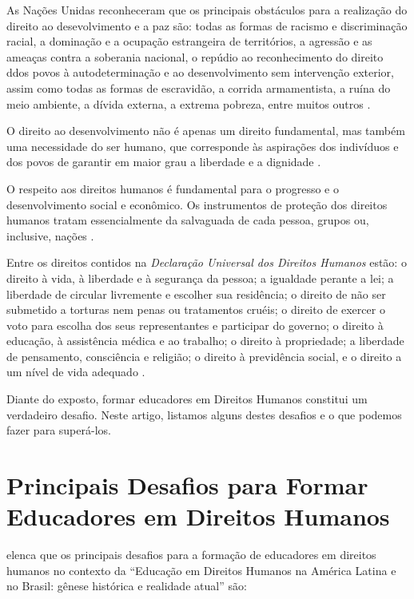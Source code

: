 \documentclass[
	article,			%
	11pt,				%
	oneside,			%
	a4paper,			%
	english,			%
	brazil,				%
	sumario=tradicional
]{abntex2}
\begin{document}
As Nações Unidas reconheceram que os principais obstáculos para a realização do
direito ao desevolvimento e a paz são: todas as formas de racismo e
discriminação racial, a dominação e a ocupação estrangeira de territórios, a
agressão e as ameaças contra a soberania nacional, o repúdio ao reconhecimento
do direito ddos povos à autodeterminação e ao desenvolvimento sem intervenção
exterior, assim como todas as formas de escravidão, a corrida armamentista,
a ruína do meio ambiente, a dívida externa, a extrema pobreza, entre muitos
outros \cite{RAYO2004}.

\noindent
O direito ao desenvolvimento não é apenas um direito fundamental, mas também uma
necessidade do ser humano, que corresponde às aspirações dos indivíduos e dos
povos de garantir em maior grau a liberdade e a dignidade
\cite{RAYO2004}.

\noindent
O respeito aos direitos humanos é fundamental para o progresso e o
desenvolvimento social e econômico. Os instrumentos de proteção dos direitos
humanos tratam essencialmente da salvaguada de cada pessoa, grupos ou,
inclusive, nações \cite{RAYO2004}.

\noindent
Entre os direitos contidos na \textit{Declaração Universal dos Direitos Humanos}
estão: o direito à vida, à liberdade e à segurança da pessoa; a igualdade
perante a lei; a liberdade de circular livremente e escolher sua residência; o
direito de não ser submetido a torturas nem penas ou tratamentos cruéis; o
direito de exercer o voto para escolha dos seus representantes e participar do
governo; o direito à educação, à assistência médica e ao trabalho; o direito à
propriedade; a liberdade de pensamento, consciência e religião; o direito à
previdência social, e o direito a um nível de vida adequado
\cite{ONU1948}.

\noindent
Diante do exposto, formar educadores em Direitos Humanos constitui um verdadeiro
desafio. Neste artigo, listamos alguns destes desafios e o que podemos fazer
para superá-los.

\section{Principais Desafios para Formar Educadores em Direitos Humanos}

 elenca que os principais desafios para a formação de
educadores em direitos humanos no contexto da ``Educação em Direitos Humanos na
América Latina e no Brasil: gênese histórica e realidade atual'' são:
\end{document}
